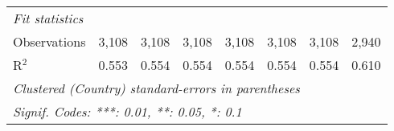 \begin{tabular}{lccccccc}
   \midrule \emph{Fit statistics}\\
   Observations                                                              & 3,108        & 3,108        & 3,108        & 3,108        & 3,108        & 3,108        & 2,940\\  
   R$^2$                                                                     & 0.553        & 0.554        & 0.554        & 0.554        & 0.554        & 0.554        & 0.610\\  
   \midrule
   \multicolumn{8}{l}{\emph{Clustered (Country) standard-errors in parentheses}}\\
   \multicolumn{8}{l}{\emph{Signif. Codes: ***: 0.01, **: 0.05, *: 0.1}}\\
\end{tabular}
\par\endgroup


